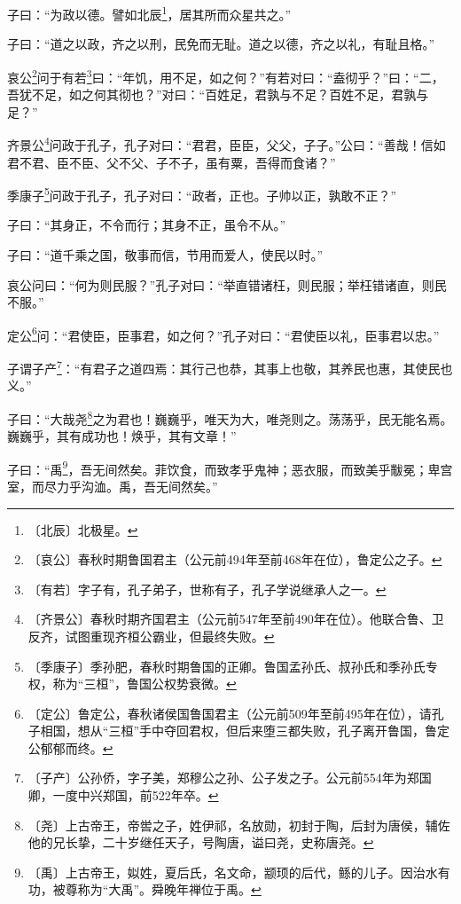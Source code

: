\documentclass[12pt,UTF-8,openany,a4]{ctexbook}
\begin{document}
\begin{large}
    
    子曰：“为政以德。譬如北辰\footnote{〔北辰〕\yiwen 北极星。}，居其所而众星共之。”
    
    子曰：“道之以政，齐之以刑，民免而无耻。道之以德，齐之以礼，有耻且格。”
    
    哀公\footnote{〔哀公〕\yiwen 春秋时期鲁国君主（公元前494年至前468年在位），鲁定公之子。}问于有若\footnote{〔有若〕\yiwen 字子有，孔子弟子，世称有子，孔子学说继承人之一。}曰：“年饥，用不足，如之何？”有若对曰：“盍彻乎？”曰：“二，吾犹不足，如之何其彻也？”对曰：“百姓足，君孰与不足？百姓不足，君孰与足？”
    
    齐景公\footnote{〔齐景公〕\yiwen 春秋时期齐国君主（公元前547年至前490年在位）。他联合鲁、卫反齐，试图重现齐桓公霸业，但最终失败。}问政于孔子，孔子对曰：“君君，臣臣，父父，子子。”公曰：“善哉！信如君不君、臣不臣、父不父、子不子，虽有粟，吾得而食诸？”
    
    季康子\footnote{〔季康子〕\yiwen 季孙肥，春秋时期鲁国的正卿。鲁国孟孙氏、叔孙氏和季孙氏专权，称为“三桓”，鲁国公权势衰微。}问政于孔子，孔子对曰：“政者，正也。子帅以正，孰敢不正？”
    
    子曰：“其身正，不令而行；其身不正，虽令不从。”
    
    子曰：“道千乘之国，敬事而信，节用而爱人，使民以时。”
    
    哀公问曰：“何为则民服？”孔子对曰：“举直错诸枉，则民服；举枉错诸直，则民不服。”
    
    定公\footnote{〔定公〕\yiwen 鲁定公，春秋诸侯国鲁国君主（公元前509年至前495年在位），请孔子相国，想从“三桓”手中夺回君权，但后来堕三都失败，孔子离开鲁国，鲁定公郁郁而终。}问：“君使臣，臣事君，如之何？”孔子对曰：“君使臣以礼，臣事君以忠。”
    
    子谓子产\footnote{〔子产〕\yiwen 公孙侨，字子美，郑穆公之孙、公子发之子。公元前554年为郑国卿，一度中兴郑国，前522年卒。}：“有君子之道四焉：其行己也恭，其事上也敬，其养民也惠，其使民也义。”
    
    子曰：“大哉尧\footnote{〔尧〕\yiwen 上古帝王，帝喾之子，姓伊祁，名放勋，初封于陶，后封为唐侯，辅佐他的兄长挚，二十岁继任天子，号陶唐，谥曰尧，史称唐尧。}之为君也！巍巍乎，唯天为大，唯尧则之。荡荡乎，民无能名焉。巍巍乎，其有成功也！焕乎，其有文章！”
    
    子曰：“禹\footnote{〔禹〕\yiwen 上古帝王，姒姓，夏后氏，名文命，颛顼的后代，鲧的儿子。因治水有功，被尊称为“大禹”。舜晚年禅位于禹。}，吾无间然矣。菲饮食，而致孝乎鬼神；恶衣服，而致美乎黻冕；卑宫室，而尽力乎沟洫。禹，吾无间然矣。”
\end{large}
\end{document}
